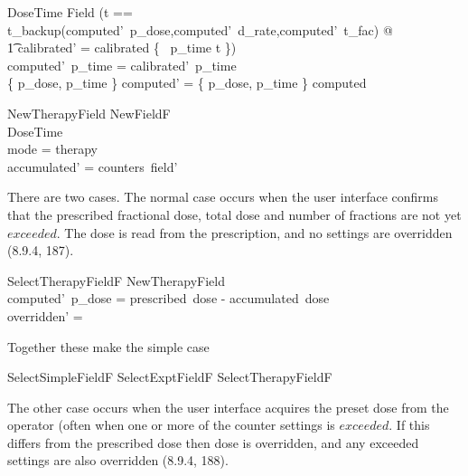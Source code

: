 \documentclass{article}
\begin{document}
\begin{schema}{DoseTime}
	\Delta Field
\where
(\LET t == t\_backup(computed'~p\_dose,computed'~d\_rate,computed'~t\_fac) @ \\
\t1	calibrated' = calibrated \oplus \{ ~p\_time \mapsto t \}) \\
	computed'~p\_time = calibrated'~p\_time \\
	\{ p\_dose, p\_time \} \ndres computed' = \{ p\_dose, p\_time \} \ndres computed
\end{schema}
	
\begin{schema}{NewTherapyField}
	NewFieldF \\
	DoseTime \\
\where
	mode = therapy \\
	accumulated' = counters~field' \\ 
\end{schema}
There are two cases.  The normal case occurs when the user interface
confirms that the prescribed fractional
dose, total dose and number of fractions are not yet $exceeded$. The
dose is read from the prescription, and no
settings are overridden (8.9.4, 187).

\begin{schema}{SelectTherapyFieldF}
	NewTherapyField \\
\where
	computed'~p\_dose = prescribed~dose - accumulated~dose \\
	overridden' = \emptyset
\end{schema}
Together these make the simple case

\begin{zed}
	SelectSimpleFieldF  SelectExptFieldF \lor SelectTherapyFieldF
\end{zed}
The other case occurs when the user interface acquires the preset dose
from the operator (often when one or more of the counter settings is
$exceeded$.  If this differs from the prescribed dose then dose is
overridden, and any exceeded settings are also overridden (8.9.4,
188).
\end{document}
